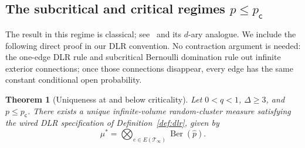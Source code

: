 \documentclass[11pt]{amsart}
\theoremstyle{plain}
\newtheorem{theorem}{Theorem}[section]
\theoremstyle{definition}
\theoremstyle{remark}
\newcommand{\pc}{p_{\mathsf{c}}}
\begin{document}
\subsection{The subcritical and critical regimes \texorpdfstring{$p\le\pc$}{p <= pc}}

The result in this regime is classical; see~\cite[Theorem~10.82(d)]{grimmett2006randomcluster} and its $d$-ary analogue. We include the following direct proof in our DLR convention. No contraction argument is needed: the one-edge DLR rule and subcritical Bernoulli domination rule out infinite exterior connections; once those connections disappear, every edge has the same constant conditional open probability.

\begin{theorem}[Uniqueness at and below criticality]
\label{thm:subcritical-uniqueness}
Let $0<q<1$, $\Delta\ge3$, and $p\le\pc$. There exists a unique infinite-volume random-cluster measure satisfying the wired DLR specification of Definition~\ref{def:dlr}, given by
\[
    \mu^*
    =
    \bigotimes_{e\in E(\mathcal T_\infty)}
    \operatorname{Ber}(\widehat p).
\]
\end{theorem}
\end{document}
